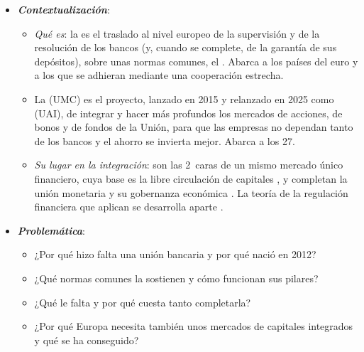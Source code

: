 \documentclass[11pt]{article}
\begin{document}
\begin{itemize}
\item \textbf{\emph{Contextualización}}:
  \begin{itemize}
  \item \emph{Qué es}: la  es el traslado al nivel europeo de la supervisión y de la resolución de los bancos (y, cuando se complete, de la garantía de sus depósitos), sobre unas normas comunes, el . Abarca a los países del euro y a los que se adhieran mediante una cooperación estrecha.
  \item La  (UMC) es el proyecto, lanzado en 2015 y relanzado en 2025 como  (UAI), de integrar y hacer más profundos los mercados de acciones, de bonos y de fondos de la Unión, para que las empresas no dependan tanto de los bancos y el ahorro se invierta mejor. Abarca a los 27.
  \item \emph{Su lugar en la integración}: son las 2~caras de un mismo mercado único financiero, cuya base es la libre circulación de capitales , y completan la unión monetaria  y su gobernanza económica . La teoría de la regulación financiera que aplican se desarrolla aparte .
  \end{itemize}

\item \textbf{\emph{Problemática}}:
  \begin{itemize}
  \item ¿Por qué hizo falta una unión bancaria y por qué nació en 2012?
  \item ¿Qué normas comunes la sostienen y cómo funcionan sus pilares?
  \item ¿Qué le falta y por qué cuesta tanto completarla?
  \item ¿Por qué Europa necesita también unos mercados de capitales integrados y qué se ha conseguido?
  \end{itemize}


\end{itemize}
\end{document}
